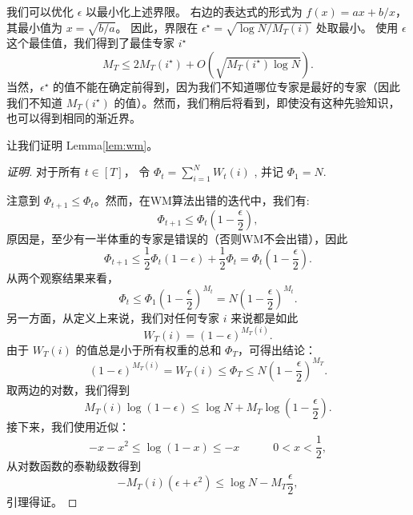 \noindent 我们可以优化 $\epsilon$ 以最小化上述界限。
右边的表达式的形式为 $f(x)=ax+b/x$，其最小值为 $x=\sqrt{b/a}$。
因此，界限在  $\epsilon^\star = \sqrt{\log N/M_T(i)}$ 处取最小。
使用 $\epsilon$ 这个最佳值，我们得到了最佳专家 $i^\star$
\[
M_T \le 2M_T(i^\star) + O\left(\sqrt {M_T(i^\star)\log N}\right).
\]
当然，$\epsilon^\star$ 的值不能在确定前得到，因为我们不知道哪位专家是最好的专家（因此我们不知道 $M_T(i^\star)$ 的值）。然而，我们稍后将看到，即使没有这种先验知识，也可以得到相同的渐近界。

让我们证明 Lemma\ref{lem:wm}。

\begin{proof}[证明]

对于所有 $t \in [T]$， 令 $\Phi_t= \sum_{i=1}^N W_t(i)$ , 并记 $\Phi_1=N$.

注意到 $\Phi_{t+1} \le \Phi_t$。然而，在WM算法出错的迭代中，我们有:
$$\Phi_{t+1} \le \Phi_t(1-\frac{\epsilon}{2}) ,$$
原因是，至少有一半体重的专家是错误的（否则WM不会出错），因此
\[
\Phi_{t+1} \le  \frac{1}{2} \Phi_t(1-\epsilon) + \frac {1} {2} \Phi_t =\Phi_t(1-\frac {\epsilon}{2}) .
\]
从两个观察结果来看，
\[
\Phi_{t} \le \Phi_1 (1-\frac{\epsilon}{2})^{M_t} = N (1-\frac{\epsilon}{2})^{M_t} .
\]
另一方面，从定义上来说，我们对任何专家 $i$ 来说都是如此
\[
W_T(i) = (1-\epsilon)^{M_T(i)} .
\]
由于 $W_T(i)$ 的值总是小于所有权重的总和 $\Phi_T$，可得出结论：
\[
(1-\epsilon)^{M_T(i)} = W_T(i) \le \Phi_T \le N(1-\frac{\epsilon}{2})^{M_T}.
\]
取两边的对数，我们得到
\[
M_T(i)\log(1-\epsilon) \le \log{N} + M_T\log{(1-\frac{\epsilon}{2})}  .
\]
接下来，我们使用近似：
\[
-x-x^2 \le \log{(1-x)} \le -x  \qquad  \quad 0 < x < \frac{1}{2},
\]
从对数函数的泰勒级数得到
\[
-M_T(i)(\epsilon+\epsilon^2) \le \log{N} - M_T\frac {\epsilon}{2} ,
\]
引理得证。
\end{proof}

